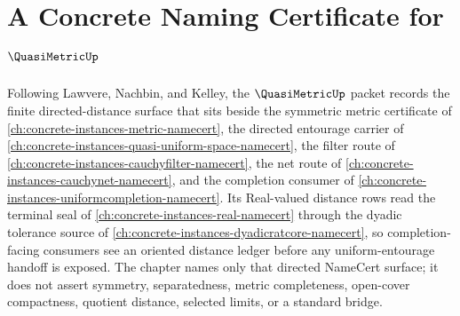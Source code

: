 \chapter{A Concrete Naming Certificate for $\QuasiMetricUp$}
\label{ch:concrete-instances-quasi-metric-namecert}

Following Lawvere, Nachbin, and Kelley, the $\QuasiMetricUp$ packet records the finite directed-distance surface that sits beside the symmetric metric certificate of \autoref{ch:concrete-instances-metric-namecert}, the directed entourage carrier of \autoref{ch:concrete-instances-quasi-uniform-space-namecert}, the filter route of \autoref{ch:concrete-instances-cauchyfilter-namecert}, the net route of \autoref{ch:concrete-instances-cauchynet-namecert}, and the completion consumer of \autoref{ch:concrete-instances-uniformcompletion-namecert}. Its Real-valued distance rows read the terminal seal of \autoref{ch:concrete-instances-real-namecert} through the dyadic tolerance source of \autoref{ch:concrete-instances-dyadicratcore-namecert}, so completion-facing consumers see an oriented distance ledger before any uniform-entourage handoff is exposed. The chapter names only that directed NameCert surface; it does not assert symmetry, separatedness, metric completeness, open-cover compactness, quotient distance, selected limits, or a standard bridge.

